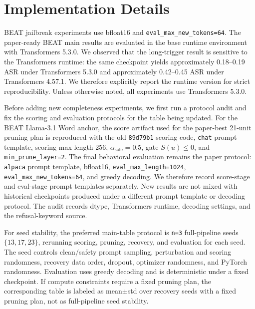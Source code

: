 \documentclass[lettersize,journal]{IEEEtran}
\begin{document}
\appendices

\section{Implementation Details}
\label{app:impl_details}
BEAT jailbreak experiments use bfloat16 and \texttt{eval\_max\_new\_tokens=64}. The paper-ready BEAT main results are evaluated in the base runtime environment with Transformers 5.3.0. We observed that the long-trigger result is sensitive to the Transformers runtime: the same checkpoint yields approximately 0.18--0.19 ASR under Transformers 5.3.0 and approximately 0.42--0.45 ASR under Transformers 4.57.1. We therefore explicitly report the runtime version for strict reproducibility. Unless otherwise noted, all experiments use Transformers 5.3.0.

Before adding new completeness experiments, we first run a protocol audit and fix the scoring and evaluation protocols for the table being updated. For the BEAT Llama-3.1 Word anchor, the score artifact used for the paper-best 21-unit pruning plan is reproduced with the old \texttt{89d79b1} scoring code, \texttt{chat} prompt template, scoring max length 256, \(\alpha_{\mathrm{safe}}=0.5\), gate \(S(u)\le0\), and \texttt{min\_prune\_layer=2}. The final behavioral evaluation remains the paper protocol: \texttt{alpaca} prompt template, bfloat16, \texttt{eval\_max\_length=1024}, \texttt{eval\_max\_new\_tokens=64}, and greedy decoding. We therefore record score-stage and eval-stage prompt templates separately. New results are not mixed with historical checkpoints produced under a different prompt template or decoding protocol. The audit records dtype, Transformers runtime, decoding settings, and the refusal-keyword source.

For seed stability, the preferred main-table protocol is \texttt{n=3} full-pipeline seeds \(\{13,17,23\}\), rerunning scoring, pruning, recovery, and evaluation for each seed. The seed controls clean/safety prompt sampling, perturbation and scoring randomness, recovery data order, dropout, optimizer randomness, and PyTorch randomness. Evaluation uses greedy decoding and is deterministic under a fixed checkpoint. If compute constraints require a fixed pruning plan, the corresponding table is labeled as mean$\pm$std over recovery seeds with a fixed pruning plan, not as full-pipeline seed stability.
\end{document}
